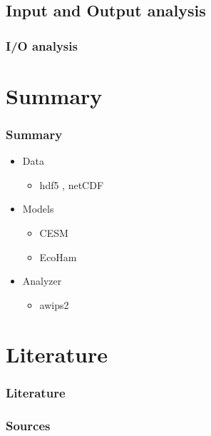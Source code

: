 \documentclass[compress]{beamer}
\begin{document}
\subsection{Input and Output analysis}
\begin{frame}[fragile]
	\frametitle{I/O analysis}


\end{frame}




\section{Summary}

\begin{frame}
	\frametitle{Summary}

	\begin{itemize}
		\item Data

		\begin{itemize}
			\item hdf5 , netCDF
		\end{itemize}

		\item Models
		\begin{itemize}
			\item CESM
			\item EcoHam
		\end{itemize}
		\item Analyzer
		\begin{itemize}
		    \item awips2
		\end{itemize}
	\end{itemize}
\end{frame}

\section*{Literature}

\begin{frame}[allowframebreaks]
	\frametitle{Literature}
    \frametitle{Sources}

	
	
\end{frame}
\end{document}
